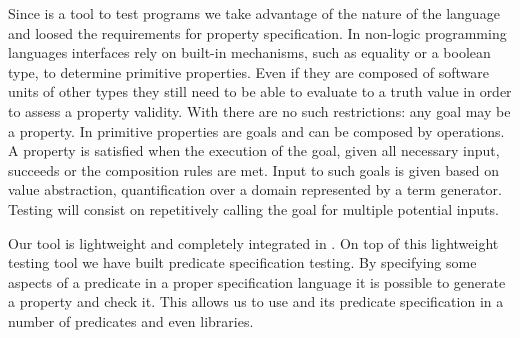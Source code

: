 Since \plqc{} is a tool to test \Prolog{} programs we take advantage of
the nature of the language and loosed the requirements for property
specification.
%
In non-logic programming languages interfaces rely on built-in mechanisms, such as equality or
a boolean type, to determine primitive properties. 
%
Even if they are composed of software units of other types they still
need to be able to evaluate to a truth value in order to assess a
property validity.
%
With \Prolog{} there are no such restrictions: any goal may be a property.
%
In \plqc{} primitive properties are %
\Prolog{} goals and can be composed by \plqc{} operations.%
%
A property is satisfied when the execution of the goal, given all
necessary input, succeeds or the composition rules are met.
%
Input to such goals is given based on \plqc{} value abstraction,
quantification over a domain represented by a term generator.
%
%
Testing will consist on repetitively calling the goal for multiple
potential inputs.




Our tool is
lightweight and completely integrated in \Prolog{}.
%
On top of this lightweight testing tool we have built predicate
specification testing.
%
By specifying some aspects of a predicate in a proper specification
language it is possible to generate a \plqc{} property and check it.
%
This %
allows us to  use \plqc{} and its predicate specification in a number of
predicates and even libraries.







